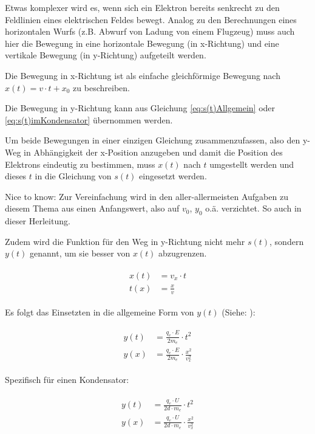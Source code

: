 Etwas komplexer wird es, wenn sich ein Elektron bereits senkrecht zu den Feldlinien eines elektrischen Feldes bewegt. Analog zu den Berechnungen eines horizontalen Wurfs (z.B. Abwurf von Ladung von einem Flugzeug) muss auch hier die Bewegung in eine horizontale Bewegung (\glqq in x-Richtung\grqq) und eine vertikale Bewegung (\glqq in y-Richtung\grqq) aufgeteilt werden. 

Die Bewegung in x-Richtung ist als einfache gleichförmige Bewegung nach $x(t)=v \cdot t + x_0$ zu beschreiben. 

Die Bewegung in y-Richtung kann aus Gleichung \ref{eq:s(t)Allgemein} oder \ref{eq:s(t)imKondensator} übernommen werden.

Um beide Bewegungen in einer einzigen Gleichung zusammenzufassen, also den y-Weg in Abhängigkeit der x-Position anzugeben und damit die Position des Elektrons eindeutig zu bestimmen, 
muss $x(t)$ nach $t$ umgestellt werden und dieses $t$ in die Gleichung von $s(t)$ eingesetzt werden. 

\begin{leftbar}
Nice to know: Zur Vereinfachung wird in den aller-allermeisten Aufgaben zu diesem Thema aus einen Anfangswert, also auf $v_0$, $y_0$ o.ä. verzichtet. So auch in dieser Herleitung.
\end{leftbar}

Zudem wird die Funktion für den Weg in y-Richtung nicht mehr $s(t)$, sondern $y(t)$ genannt, um sie besser von $x(t)$ abzugrenzen.

\begin{align} \label{eq:x(t)Senkrecht}
\begin{split}
	x(t) &= v_x \cdot t \\
	t(x) &= \frac{x}{v}
\end{split}
\end{align}

\noindent Es folgt das Einsetzten in die allgemeine Form von $y(t)$ (Siehe: ):

\begin{align} \label{eq:y(x)Allgemein}
\begin{split}
	y(t) &= \frac{q_e \cdot E}{2m_e} \cdot t^2 \\
	y(x) &= \frac{q_e \cdot E}{2m_e} \cdot \frac{x^2}{v_{x}^2}
\end{split}
\end{align}

\noindent Spezifisch für einen Kondensator:

\begin{align} \label{eq:y(x)imKondensator}
\begin{split}
	y(t) &= \frac{q_e \cdot U}{2d \cdot m_e} \cdot t^2 \\
	y(x) &= \frac{q_e \cdot U}{2d \cdot m_e} \cdot \frac{x^2}{v_{x}^2}
\end{split}
\end{align}






